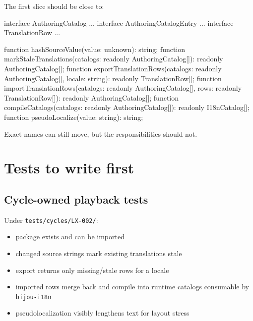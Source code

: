 The first slice should be close to:

\begin{CodeBlock}
interface AuthoringCatalog { ... }
interface AuthoringCatalogEntry { ... }
interface TranslationRow { ... }

function hashSourceValue(value: unknown): string;
function markStaleTranslations(catalogs: readonly AuthoringCatalog[]): readonly AuthoringCatalog[];
function exportTranslationRows(catalogs: readonly AuthoringCatalog[], locale: string): readonly TranslationRow[];
function importTranslationRows(catalogs: readonly AuthoringCatalog[], rows: readonly TranslationRow[]): readonly AuthoringCatalog[];
function compileCatalogs(catalogs: readonly AuthoringCatalog[]): readonly I18nCatalog[];
function pseudoLocalize(value: string): string;
\end{CodeBlock}

Exact names can still move, but the responsibilities should not.

\section{Tests to write first}\label{record-189-tests-to-write-first}

\subsection{Cycle-owned playback tests}\label{record-189-cycle-owned-playback-tests}

Under \texttt{t\allowbreak{}e\allowbreak{}s\allowbreak{}t\allowbreak{}s\allowbreak{}/\allowbreak{}c\allowbreak{}y\allowbreak{}c\allowbreak{}l\allowbreak{}e\allowbreak{}s\allowbreak{}/\allowbreak{}L\allowbreak{}X\allowbreak{}-\allowbreak{}0\allowbreak{}0\allowbreak{}2\allowbreak{}/}:

\begin{itemize}
\tightlist
\item
  package exists and can be imported
\item
  changed source strings mark existing translations stale
\item
  export returns only missing/stale rows for a locale
\item
  imported rows merge back and compile into runtime catalogs consumable by \texttt{b\allowbreak{}i\allowbreak{}j\allowbreak{}o\allowbreak{}u\allowbreak{}-\allowbreak{}i\allowbreak{}1\allowbreak{}8\allowbreak{}n}
\item
  pseudolocalization visibly lengthens text for layout stress
\end{itemize}

